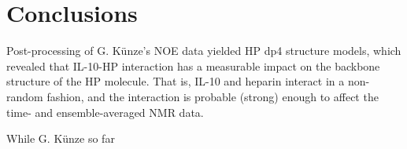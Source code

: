 


\section{Conclusions}
Post-processing of G. Künze's NOE data yielded HP dp4 structure models, which
revealed that IL-10-HP interaction has a measurable impact on the backbone
structure of the HP molecule. That is, IL-10 and heparin interact in a
non-random fashion, and the interaction is probable (strong) enough to affect
the time- and ensemble-averaged NMR data.







While G. Künze so far


